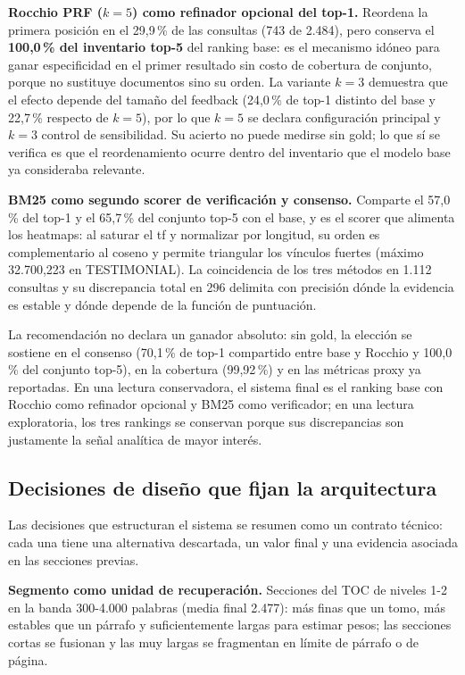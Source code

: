\documentclass[11pt]{tg_usta}
\begin{document}
\textbf{Rocchio PRF ($k=5$) como refinador opcional del top-1.} Reordena la primera posición en el 29,9\,\% de las consultas (743 de 2.484), pero conserva el \textbf{100,0\,\% del inventario top-5} del ranking base: es el mecanismo idóneo para ganar especificidad en el primer resultado sin costo de cobertura de conjunto, porque no sustituye documentos sino su orden. La variante $k=3$ demuestra que el efecto depende del tamaño del feedback (24,0\,\% de top-1 distinto del base y 22,7\,\% respecto de $k=5$), por lo que $k=5$ se declara configuración principal y $k=3$ control de sensibilidad. Su acierto no puede medirse sin gold; lo que sí se verifica es que el reordenamiento ocurre dentro del inventario que el modelo base ya consideraba relevante.

\textbf{BM25 como segundo scorer de verificación y consenso.} Comparte el 57,0\,\% del top-1 y el 65,7\,\% del conjunto top-5 con el base, y es el scorer que alimenta los heatmaps: al saturar el tf y normalizar por longitud, su orden es complementario al coseno y permite triangular los vínculos fuertes (máximo 32.700,223 en TESTIMONIAL). La coincidencia de los tres métodos en 1.112 consultas y su discrepancia total en 296 delimita con precisión dónde la evidencia es estable y dónde depende de la función de puntuación.

La recomendación no declara un ganador absoluto: sin gold, la elección se sostiene en el consenso (70,1\,\% de top-1 compartido entre base y Rocchio y 100,0\,\% del conjunto top-5), en la cobertura (99,92\,\%) y en las métricas proxy ya reportadas. En una lectura conservadora, el sistema final es el ranking base con Rocchio como refinador opcional y BM25 como verificador; en una lectura exploratoria, los tres rankings se conservan porque sus discrepancias son justamente la señal analítica de mayor interés.

\subsection{Decisiones de diseño que fijan la arquitectura}

Las decisiones que estructuran el sistema se resumen como un contrato técnico: cada una tiene una alternativa descartada, un valor final y una evidencia asociada en las secciones previas.

\textbf{Segmento como unidad de recuperación.} Secciones del TOC de niveles 1-2 en la banda 300-4.000 palabras (media final 2.477): más finas que un tomo, más estables que un párrafo y suficientemente largas para estimar pesos; las secciones cortas se fusionan y las muy largas se fragmentan en límite de párrafo o de página.
\end{document}
